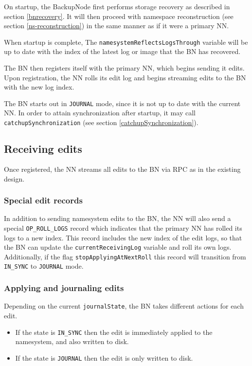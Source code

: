 \documentclass{article}
\begin{document}
On startup, the BackupNode first performs storage recovery as described in section \ref{bnrecovery}.
It will then proceed with namespace reconstruction (see section \ref{ns-reconstruction}) in the same manner as if it were a primary NN.

When startup is complete, The {\tt namesystemReflectsLogsThrough} variable will be up to date with the index of the latest log or image that the BN has recovered.

The BN then registers itself with the primary NN, which begins sending it edits. Upon registration, the NN rolls its edit log and begins streaming edits to the BN with the new log index.

The BN starts out in {\tt JOURNAL} mode, since it is not up to date with the current NN. In order to attain synchronization after startup, it may call {\tt catchupSynchronization} (see section \ref{catchupSynchronization}).

\subsection{Receiving edits}

Once registered, the NN streams all edits to the BN via RPC as in the existing design.

\subsubsection{Special edit records}

In addition to sending namesystem edits to the BN, the NN will also send a special {\tt OP\_ROLL\_LOGS} record which indicates that the primary NN has rolled its logs to a new index. This record includes the new index of the edit logs, so that the BN can update the {\tt currentReceivingLog} variable and roll its own logs. Additionally, if the flag {\tt stopApplyingAtNextRoll} this record will transition from {\tt IN\_SYNC} to {\tt JOURNAL} mode.\label{stopApplyingAtNextRoll}

\subsubsection{Applying and journaling edits}

Depending on the current {\tt journalState}, the BN takes different actions for each edit.

\begin{itemize}
\item If the state is {\tt IN\_SYNC} then the edit is immediately applied to the namesystem, and also written to disk.
\item If the state is {\tt JOURNAL} then the edit is only written to disk.
\end{itemize}
\end{document}
